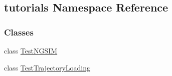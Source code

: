 \hypertarget{namespacetutorials}{\subsection{tutorials Namespace Reference}
\label{namespacetutorials}
}
\subsubsection*{Classes}
\begin{DoxyCompactItemize}
\item 
class \hyperlink{classtutorials_1_1TestNGSIM}{Test\-N\-G\-S\-I\-M}
\item 
class \hyperlink{classtutorials_1_1TestTrajectoryLoading}{Test\-Trajectory\-Loading}
\end{DoxyCompactItemize}
